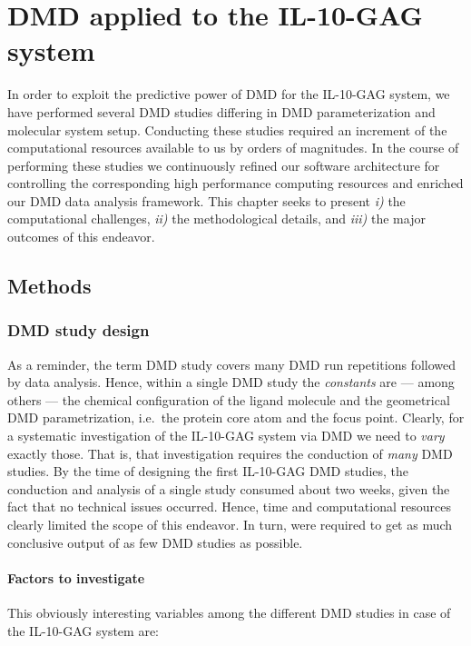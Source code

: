 \chapter{DMD applied to the IL-10-GAG system}

In order to exploit the predictive power of DMD for the IL-10-GAG system, we
have performed several DMD studies differing in DMD parameterization and
molecular system setup. Conducting these studies required an increment of the
computational resources available to us by orders of magnitudes. In the course
of performing these studies we continuously refined our software architecture
for controlling the corresponding high performance computing resources and
enriched our DMD data analysis framework. This chapter seeks to present
\textit{i)} the computational challenges, \textit{ii)} the methodological
details, and \textit{iii)} the major outcomes of this endeavor.


\section{Methods}

\subsection{DMD study design}

As a reminder, the term DMD study covers many DMD run repetitions followed by
data analysis. Hence, within a single DMD study the \textit{constants} are ---
among others --- the chemical configuration of the ligand molecule and the
geometrical DMD parametrization, i.e.\ the protein core atom and the focus
point. Clearly, for a systematic investigation of the IL-10-GAG system via DMD
we need to \textit{vary} exactly those. That is, that investigation requires the
conduction of \textit{many} DMD studies. By the time of designing the first
IL-10-GAG DMD studies, the conduction and analysis of a single study consumed
about two weeks, given the fact that no technical issues occurred. Hence, time
and computational resources clearly limited the scope of this endeavor. In turn,
were required to get as much conclusive output of as few DMD studies as
possible.

\subsubsection{Factors to investigate}

This obviously interesting variables among the different DMD studies in case of
the IL-10-GAG system are:

